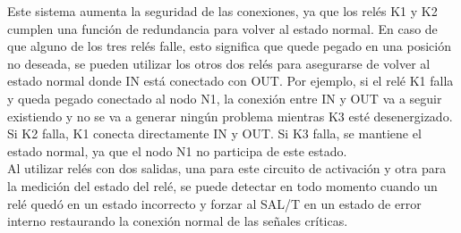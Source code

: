 Este sistema aumenta la seguridad de las conexiones, ya que los relés K1 y K2 cumplen una función de redundancia para volver al estado normal. En caso de que alguno de los tres relés falle, esto significa que quede pegado en una posición no deseada, se pueden utilizar los otros dos relés para asegurarse de volver al estado normal donde IN está conectado con OUT. Por ejemplo, si el relé K1 falla y queda pegado conectado al nodo N1, la conexión entre IN y OUT va a seguir existiendo y no se va a generar ningún problema mientras K3 esté desenergizado. Si K2 falla, K1 conecta directamente IN y OUT. Si K3 falla, se mantiene el estado normal, ya que el nodo N1 no participa de este estado. \\ 

Al utilizar relés con dos salidas, una para este circuito de activación y otra para la medición del estado del relé, se puede detectar en todo momento cuando un relé quedó en un estado incorrecto y forzar al SAL/T en un estado de error interno restaurando la conexión normal de las señales críticas. 
